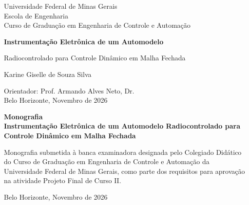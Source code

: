 \begin{titlepage}
\begin{center}
{\large Universidade Federal de Minas Gerais\\
Escola de Engenharia \\
Curso de Graduação em Engenharia de Controle e Automação\\}

\vspace{6cm}
{\bf\Large Instrumentação Eletrônica de um Automodelo\vspace{0.2cm}

Radiocontrolado para Controle Dinâmico em Malha Fechada}
\vspace{4cm}

{\large Karine Giselle de Souza Silva}
\vspace{2cm}

{\large Orientador: Prof. Armando Alves Neto, Dr.}\\

\vfill
{\large Belo Horizonte, Novembro de 2026 }
\end{center}

\end{titlepage}

\newpage
\clearpage
\thispagestyle{empty}

\begin{titlepage}

\centering
\textbf{Monografia}\\
\vspace{2cm}
\centering
\textbf{Instrumentação Eletrônica de um Automodelo Radiocontrolado para Controle Dinâmico em Malha Fechada}\\
\vspace{5cm}

\parbox{1.0\textwidth}
{\large
Monografia submetida à banca examinadora
designada pelo Colegiado Didático do Curso de
Graduação em Engenharia de Controle e
Automação da Universidade Federal de Minas
Gerais, como parte dos requisitos para aprovação na
atividade Projeto Final de Curso II.}

\vspace{7cm}
\centering
Belo Horizonte, Novembro de 2026

\end{titlepage}
